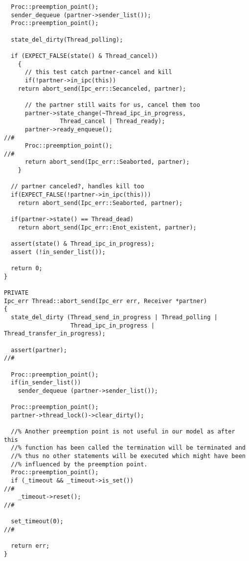 \begin{lstlisting}
  Proc::preemption_point();
  sender_dequeue (partner->sender_list());
  Proc::preemption_point();

  state_del_dirty(Thread_polling);

  if (EXPECT_FALSE(state() & Thread_cancel))
    {
      // this test catch partner-cancel and kill
      if(!partner->in_ipc(this))
	return abort_send(Ipc_err::Secanceled, partner);
      
      // the partner still waits for us, cancel them too
      partner->state_change(~Thread_ipc_in_progress,
			    Thread_cancel | Thread_ready);
      partner->ready_enqueue();                                            //#
      Proc::preemption_point();                                            //#
      return abort_send(Ipc_err::Seaborted, partner);
    }

  // partner canceled?, handles kill too
  if(EXPECT_FALSE(!partner->in_ipc(this))) 
    return abort_send(Ipc_err::Seaborted, partner);

  if(partner->state() == Thread_dead)
    return abort_send(Ipc_err::Enot_existent, partner);

  assert(state() & Thread_ipc_in_progress);
  assert (!in_sender_list());

  return 0;
}

PRIVATE
Ipc_err Thread::abort_send(Ipc_err err, Receiver *partner)
{
  state_del_dirty (Thread_send_in_progress | Thread_polling | 
                   Thread_ipc_in_progress | Thread_transfer_in_progress);

  assert(partner);                                                         //#

  Proc::preemption_point();
  if(in_sender_list())
    sender_dequeue (partner->sender_list());

  Proc::preemption_point();
  partner->thread_lock()->clear_dirty();

  //% Another preemption point is not useful in our model as after this
  //% function has been called the termination will be terminated and
  //% thus no other statements will be executed which might have been
  //% influenced by the preemption point.
  Proc::preemption_point();
  if (_timeout && _timeout->is_set())                                      //#
    _timeout->reset();                                                     //#

  set_timeout(0);                                                          //#
	  
  return err;
}


\end{lstlisting}
